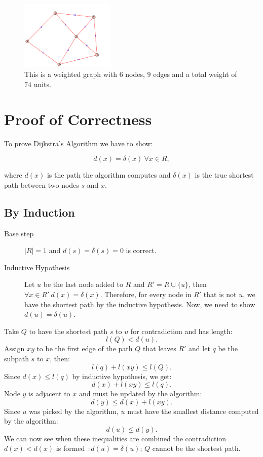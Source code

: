 \documentclass[a4paper]{article}
\begin{document}
\begin{figure}[ht]
\centering
\includegraphics[width=0.4\textwidth]{weighted_python_graph111.pdf}
\caption{\label{fig:figure 3}This is a weighted graph with $6$ nodes, $9$ edges and a total weight of $74$ units.}
\end{figure}

\section{Proof of Correctness}
To prove Dijkstra's Algorithm we have to show: 

$$d(x) = \delta(x) \ \forall x \in R,$$

where $d(x)$ is the path the algorithm computes and $\delta(x)$ is the true shortest path between two nodes $s$ and $x$.

\subsection{By Induction}

 \begin{description}
\item[Base step] $|R| = 1$ and $d(s) = \delta(s) = 0$ is correct.
\item[Inductive Hypothesis] Let $u$ be the last node added to $R$ and $R' = R \cup \{u\}$, then $\forall x \in R' \ d(x) = \delta(x)$. Therefore, for every node in $R'$ that is not $u$, we have the shortest path by the inductive hypothesis. Now, we need to show $d(u) = \delta(u).$
\end{description}
Take $Q$ to have the shortest path $s$ to $u$ for contradiction and has length: 
$$l(Q) < d(u).$$
Assign $xy$ to be the first edge of the path $Q$ that leaves $R'$ and let $q$ be the subpath $s$ to $x$, then:
$$l(q) + l(xy) \leq l(Q).$$
Since $d(x) \leq l(q)$ by inductive hypothesis, we get:
$$d(x) + l(xy) \leq l(q).$$
Node $y$ is adjacent to $x$ and must be updated by the algorithm:
$$d(y) \leq d(x) + l(xy).$$
Since $u$ was picked by the algorithm, $u$ must have the smallest distance computed by the algorithm:
$$d(u) \leq d(y).$$
We can now see when these inequalities are combined the contradiction $d(x) < d(x)$ is formed $\therefore d(u) = \delta(u)$; $Q$ cannot be the shortest path. \cite{Proof}



\end{document}
